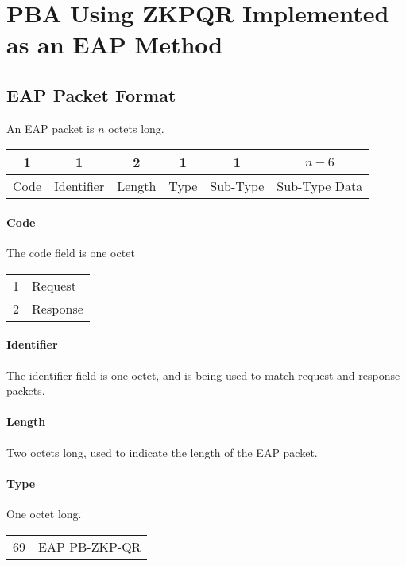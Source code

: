 \section{PBA Using ZKPQR Implemented as an EAP Method} %

\subsection{EAP Packet Format}
An EAP packet is $n$ octets long.


\begin{center}
\begin{tabular}{|c|c|c|c|c|c|}
	\hline
	1 & 1 & 2 & 1 & 1 & $n - 6$\\
	\hline
	Code & Identifier & Length & Type & Sub-Type & Sub-Type Data\\
	\hline 
\end{tabular}
\end{center}

\paragraph{Code}
The code field is one octet

\bigskip

\begin{tabular}{ll}
	1 & Request \\
	2 & Response\\
\end{tabular}

\paragraph{Identifier} The identifier field is one octet, and is being used to match request and response packets.

\paragraph{Length} Two octets long, used to indicate the length of the EAP packet.

\paragraph{Type} One octet long.

\bigskip

\begin{tabular}{ll} %
	69 & EAP PB-ZKP-QR \\
\end{tabular}

